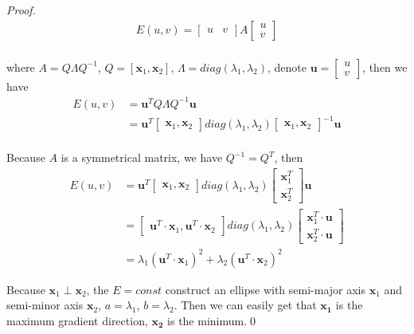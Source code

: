 \documentclass[runningheads]{llncs}
\begin{document}
\begin{proof}
\begin{align*}
    E(u, v) = 
    \begin{bmatrix}
        u &v
    \end{bmatrix}
    A
    \begin{bmatrix}
        u \\
        v
    \end{bmatrix} \\
\end{align*}
\par
where $A = Q\Lambda Q^{-1}$,
$Q = [\boldsymbol{x}_1, \boldsymbol{x}_2]$, $\Lambda = diag(\lambda_1, \lambda_2)$,
denote $\boldsymbol{u} =
\begin{bmatrix}
    u \\
    v
\end{bmatrix}$,
then we have
\begin{align*}
    E(u, v) &= 
    \boldsymbol{u}^T
    Q\Lambda Q^{-1}
    \boldsymbol{u} \\
    &= 
    \boldsymbol{u}^T
    \begin{bmatrix}
        \boldsymbol{x}_1, \boldsymbol{x}_2
    \end{bmatrix}
    diag(\lambda_1, \lambda_2)
    \begin{bmatrix}
        \boldsymbol{x}_1, \boldsymbol{x}_2
    \end{bmatrix}^{-1}
    \boldsymbol{u} \\
\end{align*}
\par
Because $A$ is a symmetrical matrix, we have $Q^{-1} = Q^T$,
then
\begin{align*}
    E(u, v) &=
    \boldsymbol{u}^T
    \begin{bmatrix}
        \boldsymbol{x}_1, \boldsymbol{x}_2
    \end{bmatrix}
    diag(\lambda_1, \lambda_2)
    \begin{bmatrix}
        \boldsymbol{x}_1^T \\
        \boldsymbol{x}_2^T
    \end{bmatrix}
    \boldsymbol{u} \\
    &=
    \begin{bmatrix}
        \boldsymbol{u}^T \cdot \boldsymbol{x}_1, \boldsymbol{u}^T \cdot \boldsymbol{x}_2
    \end{bmatrix}
    diag(\lambda_1, \lambda_2)
    \begin{bmatrix}
        \boldsymbol{x}_1^T \cdot \boldsymbol{u}\\
        \boldsymbol{x}_2^T \cdot \boldsymbol{u}
    \end{bmatrix}\\
    &=
    \lambda_1 (\boldsymbol{u}^T \cdot \boldsymbol{x}_1)^2 + \lambda_2 (\boldsymbol{u}^T \cdot \boldsymbol{x}_2)^2
\end{align*}
\par
Because $\boldsymbol{x}_1 \perp \boldsymbol{x}_2$,
the $E = const$ construct an ellipse with semi-major axis $\boldsymbol{x}_1$
and semi-minor axis $\boldsymbol{x}_2$, $a = \lambda_1$, $b = \lambda_2$.
Then we can easily get that $\boldsymbol{x_1}$ is the maximum gradient
direction, $\boldsymbol{x_2}$ is the minimum.\qed
\end{proof}
\end{document}
